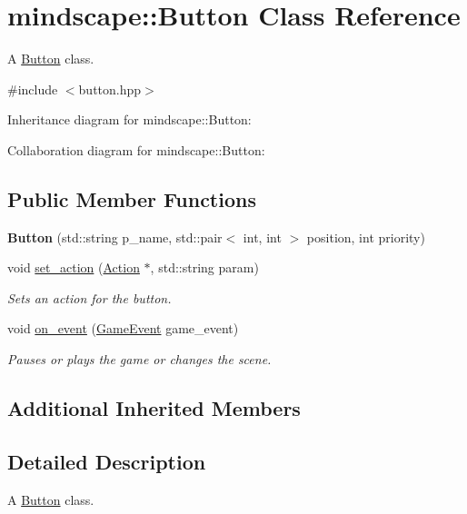 \hypertarget{classmindscape_1_1_button}{}\section{mindscape\+:\+:Button Class Reference}
\label{classmindscape_1_1_button}


A \hyperlink{classmindscape_1_1_button}{Button} class.  




{\ttfamily \#include $<$button.\+hpp$>$}



Inheritance diagram for mindscape\+:\+:Button\+:


Collaboration diagram for mindscape\+:\+:Button\+:
\subsection*{Public Member Functions}
\begin{DoxyCompactItemize}
\item 
{\bfseries Button} (std\+::string p\+\_\+name, std\+::pair$<$ int, int $>$ position, int priority)\hypertarget{classmindscape_1_1_button_a7a787c4e0289867988522f676fcb5f76}{}\label{classmindscape_1_1_button_a7a787c4e0289867988522f676fcb5f76}

\item 
void \hyperlink{classmindscape_1_1_button_ae097539464c762e064650be581b1a5d8}{set\+\_\+action} (\hyperlink{classmindscape_1_1_action}{Action} $\ast$, std\+::string param)
\begin{DoxyCompactList}\small\item\em Sets an action for the button. \end{DoxyCompactList}\item 
void \hyperlink{classmindscape_1_1_button_a1c5f7eea78429535c6cc76bcdf778a94}{on\+\_\+event} (\hyperlink{class_game_event}{Game\+Event} game\+\_\+event)
\begin{DoxyCompactList}\small\item\em Pauses or plays the game or changes the scene. \end{DoxyCompactList}\end{DoxyCompactItemize}
\subsection*{Additional Inherited Members}


\subsection{Detailed Description}
A \hyperlink{classmindscape_1_1_button}{Button} class. 

